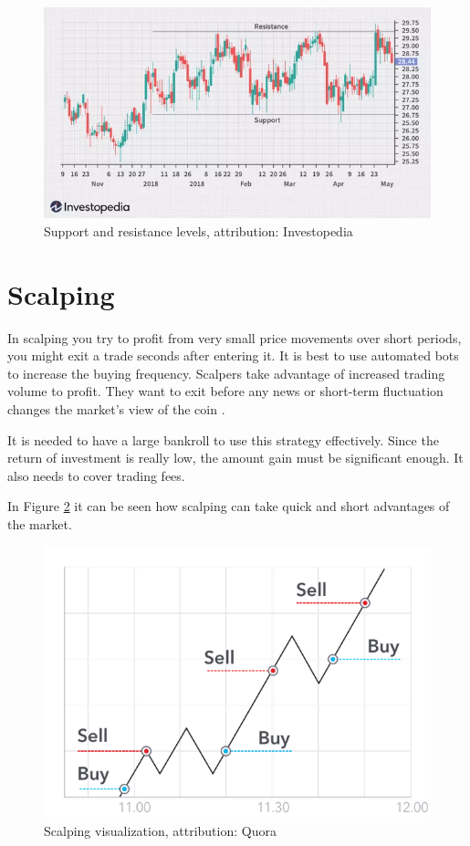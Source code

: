 \begin{figure}[ht]
    \centering
    \includegraphics[width=\columnwidth]{figures/dotdash-final-trading-range.png}
    \caption{Support and resistance levels, attribution: Investopedia \cite{investopedia:trading-range}}
    \label{sup-and-res-levels}
\end{figure}

\section{Scalping}
In scalping you try to profit from very small price movements over short periods, you might exit a trade seconds after entering it. It is best to use automated bots to increase the buying frequency. Scalpers take advantage of increased trading volume to profit. They want to exit before any news or short-term fluctuation changes the market's view of the coin \cite{best-crypto-daytrading}.

It is needed to have a large bankroll to use this strategy effectively. Since the return of investment is really low, the amount gain must be significant enough. It also needs to cover trading fees.

In Figure \ref{scalping-figure} it can be seen how scalping can take quick and short advantages of the market.

\begin{figure}[ht]
    \label{scalping-figure}
    \centering
    \includegraphics[width=\columnwidth]{figures/scalping.png}
    \caption{Scalping visualization, attribution: Quora \cite{best-crypto-daytrading}}
\end{figure}

